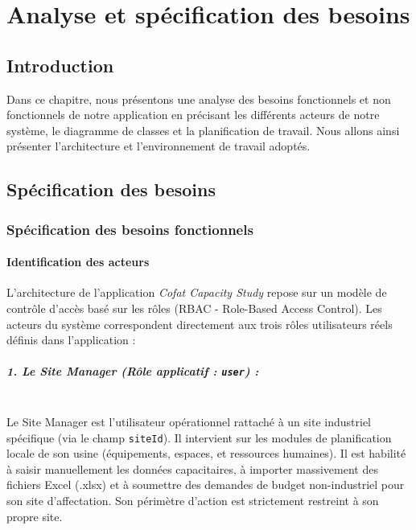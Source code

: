 \chapter{Analyse et spécification des besoins}
\label{chap:analyse_spec}

\section*{Introduction}

Dans ce chapitre, nous présentons une analyse des besoins fonctionnels et non fonctionnels de notre application en précisant les différents acteurs de notre système, le diagramme de classes et la planification de travail. Nous allons ainsi présenter l'architecture et l'environnement de travail adoptés.

\section{Spécification des besoins}

\subsection{Spécification des besoins fonctionnels}

\subsubsection{Identification des acteurs}
L'architecture de l'application \textit{Cofat Capacity Study} repose sur un modèle de contrôle d'accès basé sur les rôles (RBAC - Role-Based Access Control). Les acteurs du système correspondent directement aux trois rôles utilisateurs réels définis dans l'application :

\paragraph{1. Le Site Manager (Rôle applicatif : \texttt{user}) :}\\
Le Site Manager est l'utilisateur opérationnel rattaché à un site industriel spécifique (via le champ \texttt{siteId}). Il intervient sur les modules de planification locale de son usine (équipements, espaces, et ressources humaines). Il est habilité à saisir manuellement les données capacitaires, à importer massivement des fichiers Excel (.xlsx) et à soumettre des demandes de budget non-industriel pour son site d'affectation. Son périmètre d'action est strictement restreint à son propre site.


